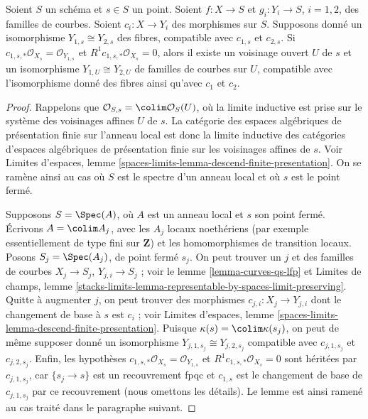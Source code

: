 \begin{lemma}
\label{lemma-contract-basic-uniqueness}
Soient $S$ un schéma et $s \in S$ un point.
Soient $f : X \to S$ et $g_i : Y_i \to S$, $i = 1, 2$, des familles de courbes.
Soient $c_i : X \to Y_i$ des morphismes sur $S$.
Supposons donné un isomorphisme $Y_{1, s} \cong Y_{2, s}$
des fibres, compatible avec $c_{1, s}$ et $c_{2, s}$.
Si $c_{1, s, *}\mathcal{O}_{X_s} = \mathcal{O}_{Y_{1, s}}$ et
$R^1c_{1, s, *}\mathcal{O}_{X_s} = 0$, alors il existe un
voisinage ouvert $U$ de $s$ et un isomorphisme
$Y_{1, U} \cong Y_{2, U}$ de familles de courbes sur $U$,
compatible avec l'isomorphisme donné des fibres ainsi qu'avec
$c_1$ et $c_2$.
\end{lemma}

\begin{proof}
Rappelons que $\mathcal{O}_{S, s} = \colim \mathcal{O}_S(U)$, où
la limite inductive est prise sur le système des voisinages affines $U$ de $s$.
La catégorie des espaces algébriques de présentation finie sur
l'anneau local est donc la limite inductive des catégories d'espaces algébriques
de présentation finie sur les voisinages affines de $s$.
Voir Limites d'espaces, lemme
\ref{spaces-limits-lemma-descend-finite-presentation}.
On se ramène ainsi au cas où $S$ est le spectre d'un
anneau local et où $s$ est le point fermé.

\medskip\noindent
Supposons $S = \Spec(A)$, où $A$ est un anneau local et $s$ son point fermé.
Écrivons $A = \colim A_j$, avec les $A_j$ locaux noethériens (par exemple essentiellement
de type fini sur $\mathbf{Z}$) et les homomorphismes de transition locaux.
Posons $S_j = \Spec(A_j)$, de point fermé $s_j$. On peut trouver un
$j$ et des familles de courbes $X_j \to S_j$, $Y_{j, i} \to S_j$ ;
voir le lemme \ref{lemma-curves-qs-lfp} et
Limites de champs, lemme
\ref{stacks-limits-lemma-representable-by-spaces-limit-preserving}.
Quitte à augmenter $j$, on peut trouver des morphismes
$c_{j, i} : X_j \to Y_{j, i}$ dont le changement de base à $s$ est $c_i$ ; voir
Limites d'espaces, lemme
\ref{spaces-limits-lemma-descend-finite-presentation}.
Puisque $\kappa(s) = \colim \kappa(s_j)$, on peut de même
supposer donné un isomorphisme $Y_{j, 1, s_j} \cong Y_{j, 2, s_j}$
compatible avec $c_{j, 1, s_j}$ et $c_{j, 2, s_j}$.
Enfin, les hypothèses
$c_{1, s, *}\mathcal{O}_{X_s} = \mathcal{O}_{Y_{1, s}}$ et
$R^1c_{1, s, *}\mathcal{O}_{X_s} = 0$
sont héritées par $c_{j, 1, s_j}$, car
$\{s_j \to s\}$ est un recouvrement fpqc et
$c_{1, s}$ est le changement de base de $c_{j, 1, s_j}$ par ce recouvrement
(nous omettons les détails).
Le lemme est ainsi ramené au cas traité dans le paragraphe suivant.


\end{proof}
